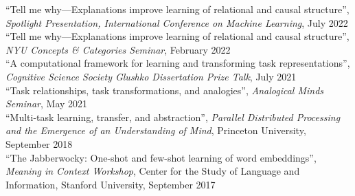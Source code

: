 \documentclass[margin]{res}
\begin{document}
\begin{resume}
{``Tell me why---Explanations improve learning of relational and causal structure'',} \textit{Spotlight Presentation, International Conference on Machine Learning}, July 2022\\[3pt] 
{``Tell me why---Explanations improve learning of relational and causal structure'',} \textit{NYU Concepts \& Categories Seminar}, February 2022\\[3pt] 
{``A computational framework for learning and transforming task representations'',} \textit{Cognitive Science Society Glushko Dissertation Prize Talk}, July 2021\\[3pt] 
{``Task relationships, task transformations, and analogies'',} \textit{Analogical Minds Seminar}, May 2021\\[3pt] 
{``Multi-task learning, transfer, and abstraction'',} \textit{Parallel Distributed Processing and the Emergence of an Understanding of Mind}, Princeton University, September 2018\\[3pt] 
{``The Jabberwocky: One-shot and few-shot learning of word embeddings'',} \textit{Meaning in Context Workshop}, Center for the Study of Language and Information,  Stanford University, September 2017 
 


\end{resume}
\end{document}
